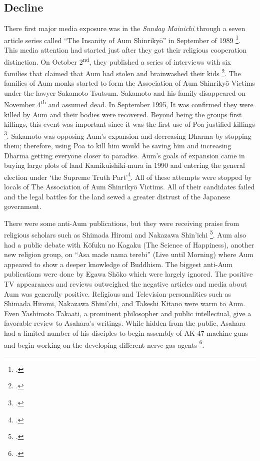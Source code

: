 \documentclass[12pt, letterpaper]{article}
\newcommand{\sorta}[1]{`#1'}
\newcommand{\poses}[1]{#1's}
\newcommand{\say}[1]{``#1''}
\begin{document}
\subsection{Decline}
There first major media exposure was in the \textit{Sunday Mainichi} through a seven article series called \say{The Insanity of Aum
  Shinriky\=o} in September of 1989 \footcite[35]{watanabe_reactions_1997}. This media attention had started
just after they got their religious cooperation distinction. On October  2\textsuperscript{nd}, they
published a series of interviews with six families that claimed that Aum had stolen and brainwashed their kids \footcite[184]{hardacre_aum_2007}. The families of
Aum monks started to form the Association of Aum Shinriky\=o Victims under the lawyer Sakamoto
Tsutsum. Sakamoto and his family disappeared on November 4\textsuperscript{th} and assumed dead. In
September 1995, It was confirmed they were killed by Aum and their bodies were recovered. Beyond being the groups first killings, this event was important since it was the first use of Poa justified killings
\footcite[89]{watanabe_religion_1998}. Sakamoto was opposing \poses{Aum} expansion and decreasing Dharma by
stopping them; therefore, using Poa to kill him would be saving him and increasing Dharma getting everyone
closer to paradise. \poses{Aum} goals of expansion came in buying large plots of land Kamikuishiki-mura in
1990 and entering the general election under \sorta{the Supreme Truth Part}\footcite[187]{hardacre_aum_2007}.
All of these attempts were stopped by locals of The Association of Aum Shinriky\=o Victims. All of their
candidates failed and the legal battles for the land sewed a greater distrust of the Japanese government.

There were some anti-Aum publications, but they were receiving praise from religious scholars such as Shimada Hiromi and Nakazawa Shin’ichi
\footcite[38]{watanabe_reactions_1997}. Aum also had a public debate with K\=ofuku no Kagaku (The Science of
Happiness), another new religion group, on \say{Asa made nama terebi} (Live until Morning) where Aum appeared to show a deeper knowledge of Buddhism. The biggest anti-Aum publications were done
by Egawa Sh\=oko which were largely ignored. The positive TV appearances
and reviews outweighed the negative articles and media about Aum was
generally positive. Religious and Television personalities such as Shimada Hiromi, Nakazawa Shini'chi, and
Takeshi Kitano were warm to Aum. Even Yashimoto Takaati, a prominent philosopher
and public intellectual, give a favorable review to \poses{Asahara} writings. While hidden from the public,
Asahara had a limited number of his disciples to begin assembly of AK-47 machine guns and begin working on
the developing different nerve gas agents \footcite[91,92]{watanabe_religion_1998}.
\end{document}
